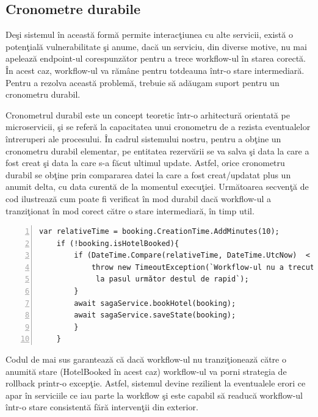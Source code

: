 \subsection{Cronometre durabile}
\par Deşi sistemul în această formă permite interacţiunea cu alte servicii, există o potenţială vulnerabilitate şi anume, dacă un serviciu, din diverse motive, nu mai apelează endpoint-ul corespunzător pentru a trece workflow-ul în starea corectă. În acest caz, workflow-ul va rămâne pentru totdeauna într-o stare intermediară. Pentru a rezolva această problemă, trebuie să adăugam suport pentru un cronometru durabil. 
\par Cronometrul durabil este un concept teoretic într-o arhitectură orientată pe microservicii, şi se referă la capacitatea unui cronometru de a rezista eventualelor întreruperi ale procesului. În cadrul sistemului nostru, pentru a obţine un cronometru durabil elementar, pe entitatea rezervării se va salva şi data la care a fost creat şi data la care s-a făcut ultimul update. Astfel, orice cronometru durabil se obţine prin compararea datei la care a fost creat/updatat plus un anumit delta, cu data curentă de la momentul execuţiei. Următoarea secvenţă de cod ilustrează cum poate fi verificat în mod durabil dacă workflow-ul a tranziţionat în mod corect către o stare intermediară, în timp util.
\begin{Verbatim}[numbers=left]
	var relativeTime = booking.CreationTime.AddMinutes(10);
	if (!booking.isHotelBooked){
		if (DateTime.Compare(relativeTime, DateTime.UtcNow)  < 0 ){
			throw new TimeoutException(`Workflow-ul nu a trecut
			 la pasul următor destul de rapid`);
		}
		await sagaService.bookHotel(booking);
		await sagaService.saveState(booking);
		}
	}
\end{Verbatim}
\par Codul de mai sus garantează că dacă workflow-ul nu tranziţionează către o anumită stare (HotelBooked în acest caz) workflow-ul va porni strategia de rollback printr-o excepţie. Astfel, sistemul devine rezilient la eventualele erori ce apar în serviciile ce iau parte la workflow şi este capabil să readucă workflow-ul într-o stare consistentă fără intervenţii din exterior. 
